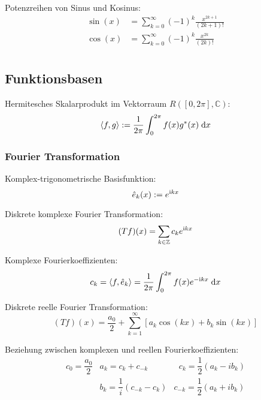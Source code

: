 \documentclass[11pt]{article}
\numberwithin{equation}{section}
\begin{document}
				\noindent
				Potenzreihen von Sinus und Kosinus:
				\begin{equation}
					\begin{aligned}
						\sin(x) &= \sum_{k=0}^\infty (-1)^k \frac{x^{2k+1}}{(2k+1)!} \\
						\cos(x) &= \sum_{k=0}^\infty (-1)^k \frac{x^{2k}}{(2k)!} \\
					\end{aligned}
				\end{equation}

		\subsection{Funktionsbasen}
			\noindent
			Hermitesches Skalarprodukt im Vektorraum $R([0,2\pi],\mathbb{C})$:
			\begin{equation}
				\left<f,g\right>:=\frac{1}{2\pi}\int_0^{2\pi} f(x)g^* (x)\;\mathrm{d} x
			\end{equation}

			\subsubsection{Fourier Transformation}
				\noindent
				Komplex-trigonometrische Basisfunktion:
				\begin{equation}
					\hat{e}_k(x):=e^{\mathrm{i} kx}
				\end{equation}

				\noindent
				Diskrete komplexe Fourier Transformation:
				\begin{equation}
					(Tf)(x)=\sum_{k\in\mathbb{Z}}c_k e^{\mathrm{i} kx}
				\end{equation}

				\noindent
				Komplexe Fourierkoeffizienten:
				\begin{equation}
					c_k = \left<f,\hat{e}_k\right>=\frac{1}{2\pi}\int_0^{2\pi}f(x)e^{-\mathrm{i} kx}\;\mathrm{d} x
				\end{equation}

				\noindent
				Diskrete reelle Fourier Transformation:
				\begin{equation}
					(Tf)(x)=\frac{a_0}{2}+\sum_{k=1}^{\infty}\left[a_k \cos(kx) + b_k \sin(kx) \right]
				\end{equation}

				\noindent
				Beziehung zwischen komplexen und reellen Fourierkoeffizienten:
				\begin{equation}
					\begin{array}{clc}
						c_0 = \dfrac{a_0}{2} & a_k = c_k+c_{-k} & \phantom{_{-}}c_k = \dfrac{1}{2}\left(a_k-ib_k\right) \\ [6pt]
						& b_k = \dfrac{1}{i}\left(c_{-k}-c_{k}\right) & c_{-k} = \dfrac{1}{2}\left(a_k+ib_k\right) \\
					\end{array}
				\end{equation}
\end{document}
